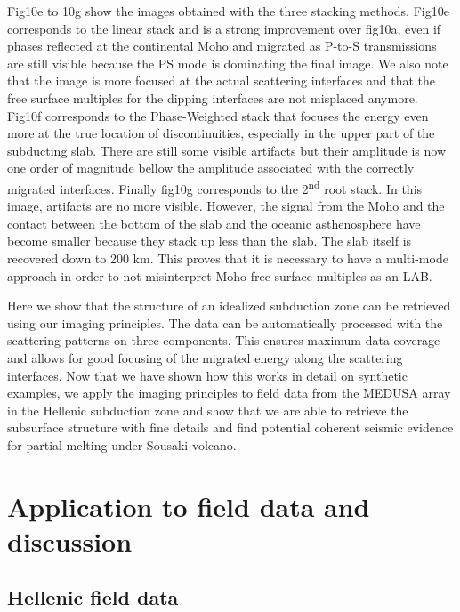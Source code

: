 \documentclass[9pt,a4paper]{article}
\numberwithin{equation}{section}
\begin{document}
\begin{multicols}{2}
Fig10e to 10g show the images obtained with the three stacking methods.
Fig10e corresponds to the linear stack and is a strong improvement over fig10a, even if phases reflected at the continental Moho and migrated as P-to-S transmissions are still visible because the PS mode is dominating the final image.
We also note that the image is more focused at the actual scattering interfaces and that the free surface multiples for the dipping interfaces are not misplaced anymore.
Fig10f corresponds to the Phase-Weighted stack that focuses the energy even more at the true location of discontinuities, especially in the upper part of the subducting slab.
There are still some visible artifacts but their amplitude is now one order of magnitude bellow the amplitude associated with the correctly migrated interfaces.
Finally fig10g corresponds to the 2\textsuperscript{nd} root stack.
In this image, artifacts are no more visible.
However, the signal from the Moho and the contact between the bottom of the slab and the oceanic asthenosphere have become smaller because they stack up less than the slab.
The slab itself is recovered down to 200 km.
This proves that it is necessary to have a multi-mode approach in order to not misinterpret Moho free surface multiples as an LAB.

Here we show that the structure of an idealized subduction zone can be retrieved using our imaging principles.
The data can be automatically processed with the scattering patterns on three components.
This ensures maximum data coverage and allows for good focusing of the migrated energy along the scattering interfaces.
Now that we have shown how this works in detail on synthetic examples, we apply the imaging principles to field data from the MEDUSA array in the Hellenic subduction zone and show that we are able to retrieve the subsurface structure with fine details and find potential coherent seismic evidence for partial melting under Sousaki volcano.

\section{Application to field data and discussion}

\subsection{Hellenic field data}


\end{multicols}
\end{document}
